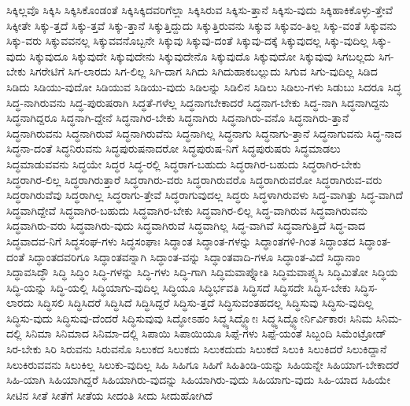 {ಸಿಕ್ಕಿಲ್ಲವೊ
ಸಿಕ್ಕಿಸಿ
ಸಿಕ್ಕಿಸಿಕೊಂಡಂತೆ
ಸಿಕ್ಕಿಸಿಕ್ಕಿದವರಿಗೆಲ್ಲಾ
ಸಿಕ್ಕಿಸಿರುವ
ಸಿಕ್ಕಿಸು-ತ್ತಾನೆ
ಸಿಕ್ಕಿಸು-ವುದು
ಸಿಕ್ಕಿಹಾಕಿಕೊಳ್ಳು-ತ್ತೇವೆ
ಸಿಕ್ಕೀತೇ
ಸಿಕ್ಕು-ತ್ತದೆ
ಸಿಕ್ಕು-ತ್ತವೆ
ಸಿಕ್ಕು-ತ್ತಾನೆ
ಸಿಕ್ಕುತ್ತಿದ್ದುದು
ಸಿಕ್ಕುತ್ತಿರುವನು
ಸಿಕ್ಕುವ
ಸಿಕ್ಕುವಂ-ತಿಲ್ಲ
ಸಿಕ್ಕು-ವಂತೆ
ಸಿಕ್ಕುವನು
ಸಿಕ್ಕು-ವರು
ಸಿಕ್ಕುವವನಲ್ಲ
ಸಿಕ್ಕುವವನೊಬ್ಬನೇ
ಸಿಕ್ಕುವು
ಸಿಕ್ಕುವು-ದಂತೆ
ಸಿಕ್ಕುವು-ದಕ್ಕೆ
ಸಿಕ್ಕುವುದಲ್ಲ
ಸಿಕ್ಕು-ವುದಿಲ್ಲ
ಸಿಕ್ಕು-ವುದು
ಸಿಕ್ಕುವುದೂ
ಸಿಕ್ಕುವುದೇ
ಸಿಕ್ಕುವುದೇನು
ಸಿಕ್ಕುವುದೇನೊ
ಸಿಕ್ಕುವುದೊ
ಸಿಕ್ಕುವುದೋ
ಸಿಕ್ಕುವುವು
ಸಿಗಬಲ್ಲದು
ಸಿಗ-ಬೇಕು
ಸಿಗರೇಟಿಗೆ
ಸಿಗ-ಲಾರದು
ಸಿಗ-ಲಿಲ್ಲ
ಸಿಗಿ-ದಾಗ
ಸಿಗಿದು
ಸಿಗಿದುಹಾಕಬಲ್ಲುದು
ಸಿಗುವ
ಸಿಗು-ವುದಿಲ್ಲ
ಸಿಡಿದ
ಸಿಡಿದು
ಸಿಡಿಯು-ವುದೋ
ಸಿಡಿಯುವ
ಸಿಡಿಯು-ವುದು
ಸಿಡಿಲನ್ನು
ಸಿಡಿಲಿನ
ಸಿಡಿಲು
ಸಿಡಿಲು-ಗಳು
ಸಿಡುಬು
ಸಿದರೂ
ಸಿದ್ಧ
ಸಿದ್ಧ-ನಾಗಿರುವನು
ಸಿದ್ಧ-ಪುರುಷರಾಗಿ
ಸಿದ್ಧತೆ-ಗಳೆಲ್ಲ
ಸಿದ್ಧನಾಗಬೇಕಾದರೆ
ಸಿದ್ಧನಾಗ-ಬೇಕು
ಸಿದ್ಧ-ನಾಗಿ
ಸಿದ್ಧನಾಗಿದ್ದನು
ಸಿದ್ಧನಾಗಿದ್ದರೂ
ಸಿದ್ಧನಾಗಿ-ದ್ದೇನೆ
ಸಿದ್ಧನಾಗಿರ-ಬೇಕು
ಸಿದ್ಧನಾಗಿರು
ಸಿದ್ಧನಾಗಿರು-ವನೊ
ಸಿದ್ಧನಾಗಿರು-ತ್ತಾನೆ
ಸಿದ್ಧನಾಗಿರುವನು
ಸಿದ್ಧನಾಗಿರುವೆ
ಸಿದ್ಧನಾಗಿರುವೆನು
ಸಿದ್ಧನಾಗಿಲ್ಲ
ಸಿದ್ಧನಾಗು
ಸಿದ್ಧನಾಗು-ತ್ತಾನೆ
ಸಿದ್ಧನಾಗುವನು
ಸಿದ್ಧ-ನಾದ
ಸಿದ್ಧನಾ-ದಂತೆ
ಸಿದ್ಧನಿರುವನು
ಸಿದ್ಧಪುರುಷನಾದರೋ
ಸಿದ್ಧಪುರುಷ-ನಿಗೆ
ಸಿದ್ಧಪುರುಷರು
ಸಿದ್ಧಮಾಡಲು
ಸಿದ್ಧಮಾಡುವವನು
ಸಿದ್ಧಯೇ
ಸಿದ್ಧರ
ಸಿದ್ಧ-ರಲ್ಲಿ
ಸಿದ್ಧರಾಗ-ಬಹುದು
ಸಿದ್ಧರಾಗಿರ-ಬಹುದು
ಸಿದ್ಧರಾಗಿರ-ಬೇಕು
ಸಿದ್ಧರಾಗಿರ-ಲಿಲ್ಲ
ಸಿದ್ಧರಾಗಿರುತ್ತಾರೆ
ಸಿದ್ಧರಾಗಿರು-ವರು
ಸಿದ್ಧರಾಗಿರುವರೊ
ಸಿದ್ಧರಾಗಿರುವರೋ
ಸಿದ್ಧರಾಗಿರುವ-ವರು
ಸಿದ್ಧರಾಗಿರುವೆವು
ಸಿದ್ಧರಾಗಿಲ್ಲ
ಸಿದ್ಧರಾಗು-ತ್ತೇವೆ
ಸಿದ್ಧರಾಗುವುದಲ್ಲ
ಸಿದ್ಧರು
ಸಿದ್ಧಳಾಗಿರುವಳು
ಸಿದ್ಧ-ವಾಗಿತ್ತು
ಸಿದ್ಧ-ವಾಗಿದೆ
ಸಿದ್ಧವಾಗಿದ್ದೇವೆ
ಸಿದ್ಧವಾಗಿರ-ಬಹುದು
ಸಿದ್ಧವಾಗಿರ-ಬೇಕು
ಸಿದ್ಧವಾಗಿರ-ಲಿಲ್ಲ
ಸಿದ್ಧ-ವಾಗಿರುವ
ಸಿದ್ಧವಾಗಿರುವನು
ಸಿದ್ಧವಾಗಿರು-ವರು
ಸಿದ್ಧವಾಗಿರು-ವುದು
ಸಿದ್ಧವಾಗಿರುವೆ
ಸಿದ್ಧವಾಗಿಲ್ಲ
ಸಿದ್ಧ-ವಾಗಿವೆ
ಸಿದ್ಧವಾಗುತ್ತಿದೆ
ಸಿದ್ಧ-ವಾದ
ಸಿದ್ಧವಾದವ-ನಿಗೆ
ಸಿದ್ಧಸಂಘ-ಗಳು
ಸಿದ್ಧಸಂಘಾಃ
ಸಿದ್ಧಾಂತ
ಸಿದ್ಧಾಂತ-ಗಳನ್ನು
ಸಿದ್ಧಾಂತಗಳಿ-ಗಿಂತ
ಸಿದ್ಧಾಂತದ
ಸಿದ್ಧಾಂತ-ದಂತೆ
ಸಿದ್ಧಾಂತದವರಿಗೂ
ಸಿದ್ಧಾಂತವನ್ನಾಗಿ
ಸಿದ್ಧಾಂತ-ವನ್ನು
ಸಿದ್ಧಾಂತವಾದಿ-ಗಳೂ
ಸಿದ್ಧಾಂತ-ವಿದೆ
ಸಿದ್ಧಾನಾಂ
ಸಿದ್ಧಾವಸಿದ್ಧೌ
ಸಿದ್ಧಿ
ಸಿದ್ಧಿಂ
ಸಿದ್ಧಿ-ಗಳನ್ನು
ಸಿದ್ಧಿ-ಗಳು
ಸಿದ್ಧಿ-ಗಾಗಿ
ಸಿದ್ಧಿಮವಾಪ್ನೋತಿ
ಸಿದ್ಧಿಮವಾಪ್ಸ್ಯಸಿ
ಸಿದ್ಧಿಮಿತೋ
ಸಿದ್ಧಿಯ
ಸಿದ್ಧಿ-ಯನ್ನು
ಸಿದ್ಧಿ-ಯಲ್ಲಿ
ಸಿದ್ಧಿಯಾಗು-ವುದಿಲ್ಲ
ಸಿದ್ಧಿಯೂ
ಸಿದ್ಧಿರ್ಭವತಿ
ಸಿದ್ಧಿಸದೆ
ಸಿದ್ಧಿಸದೇ
ಸಿದ್ಧಿಸ-ಬೇಕು
ಸಿದ್ಧಿಸ-ಲಾರದು
ಸಿದ್ಧಿಸಲಿ
ಸಿದ್ಧಿಸಿದರೆ
ಸಿದ್ಧಿಸಿದೆ
ಸಿದ್ಧಿಸಿದ್ದರೆ
ಸಿದ್ಧಿಸು-ತ್ತದೆ
ಸಿದ್ಧಿಸುವಂತಹದಲ್ಲ
ಸಿದ್ಧಿಸುವು
ಸಿದ್ಧಿಸು-ವುದಿಲ್ಲ
ಸಿದ್ಧಿಸು-ವುದು
ಸಿದ್ಧಿಸುವು-ದೆಂದರೆ
ಸಿದ್ಧಿಸುವುವು
ಸಿದ್ಧೋಽಹಂ
ಸಿದ್ಧ್ಯಸಿದ್ಧ್ಯೋಃ
ಸಿದ್ಧ್ಯಸಿದ್ಧ್ಯೋರ್ನಿರ್ವಿಕಾರಃ
ಸಿನಿಮ
ಸಿನಿಮ-ದಲ್ಲಿ
ಸಿನಿಮಾ
ಸಿನಿಮಾದ
ಸಿನಿಮಾ-ದಲ್ಲಿ
ಸಿಪಾಯಿ
ಸಿಪಾಯಿಯೂ
ಸಿಪ್ಪೆ-ಗಳು
ಸಿಪ್ಪೆ-ಯಂತೆ
ಸಿಬ್ಬಂದಿ
ಸಿಮೆಂಟ್ರೋಡ್
ಸಿರ-ಬೇಕು
ಸಿರಿ
ಸಿರುವನು
ಸಿರುವನೊ
ಸಿಲುಕದ
ಸಿಲುಕದು
ಸಿಲುಕದುದು
ಸಿಲುಕದೆ
ಸಿಲುಕಿ
ಸಿಲುಕಿದರೆ
ಸಿಲುಕಿದ್ದಾನೆ
ಸಿಲುಕಿರುವವನು
ಸಿಲುಕಿಲ್ಲ
ಸಿಲುಕು-ವುದಿಲ್ಲ
ಸಿಹಿ
ಸಿಹಿಗೂ
ಸಿಹಿಗೆ
ಸಿಹಿತಿಂಡಿ-ಯನ್ನು
ಸಿಹಿಯನ್ನೇ
ಸಿಹಿಯಾಗ-ಬೇಕಾದರೆ
ಸಿಹಿ-ಯಾಗಿ
ಸಿಹಿಯಾಗಿದ್ದರೆ
ಸಿಹಿಯಾಗಿರು-ವುದನ್ನು
ಸಿಹಿಯಾಗಿರು-ವುದು
ಸಿಹಿಯಾಗು-ವುದು
ಸಿಹಿ-ಯಾದ
ಸಿಹಿಯೇ
ಸೀಟಿನ
ಸೀತೆ
ಸೀತೆಗೆ
ಸೀತೆಯ
ಸೀದಂತಿ
ಸೀದು
ಸೀದುಹೋಗಿದೆ
}
